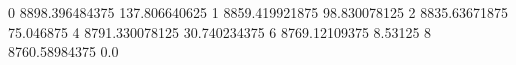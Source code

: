 0 8898.396484375 137.806640625
1 8859.419921875 98.830078125
2 8835.63671875 75.046875
4 8791.330078125 30.740234375
6 8769.12109375 8.53125
8 8760.58984375 0.0
